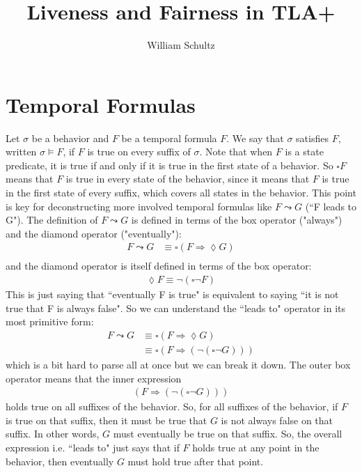 \documentclass[11pt, oneside]{article}   	%
\title{Liveness and Fairness in TLA+}
\author{William Schultz}
\begin{document}
\maketitle

\section*{Temporal Formulas}

Let $\sigma$ be a behavior and $F$ be a temporal formula $F$. We say that $\sigma$ satisfies $F$, written $\sigma \vDash F$, if $F$ is true on every suffix of $\sigma$. Note that when $F$ is a state predicate, it is true if and only if it is true in the first state of a behavior. So $\square F$ means that $F$ is true in every state of the behavior, since it means that $F$ is true in the first state of every suffix, which covers all states in the behavior. This point is key for deconstructing more involved temporal formulas like $F \leadsto G$ (``F leads to G"). The definition of $F \leadsto G$ is defined in terms of the box operator ("always") and the diamond operator ("eventually"):
\begin{align*}
F \leadsto G &\equiv \square(F \Rightarrow \lozenge G) \\
\end{align*}
and the diamond operator is itself defined in terms of the box operator:
\begin{align*}
\lozenge F \equiv \neg(\square \neg F)
\end{align*}
This is just saying that ``eventually F is true"  is equivalent to saying ``it is not true that F is always false". So we can understand the ``leads to" operator in its most primitive form:
\begin{align*}
F \leadsto G &\equiv \square(F \Rightarrow \lozenge G) \\
& \equiv \square(F \Rightarrow (\neg(\square \neg G)))
\end{align*}
which is a bit hard to parse all at once but we can break it down. The outer box operator means that the inner expression
\begin{align*}
(F \Rightarrow (\neg(\square \neg G)))
\end{align*}
holds true on all suffixes of the behavior. So, for all suffixes of the behavior, if $F$ is true on that suffix, then it must be true that $G$ is not always false on that suffix. In other words, $G$ must eventually be true on that suffix. So, the overall expression i.e. ``leads to" just says that if $F$ holds true at any point in the behavior, then eventually $G$ must hold true after that point.
\end{document}
